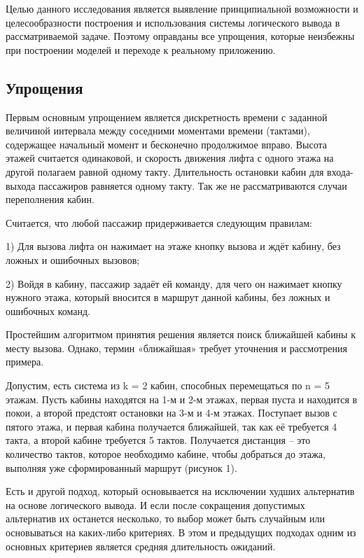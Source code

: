 
	Целью данного исследования является выявление принципиальной возможности и целесообразности построения
		и использования системы логического вывода в рассматриваемой задаче.
		Поэтому оправданы все упрощения, которые неизбежны при построении моделей и переходе к реальному приложению.

\subsection{Упрощения}
	Первым основным упрощением является дискретность времени с заданной величиной интервала между
		соседними моментами времени (тактами), содержащее начальный момент и бесконечно продолжимое вправо.
		Высота этажей считается одинаковой, и скорость движения лифта с одного этажа на другой полагаем
		равной одному такту. Длительность остановки кабин для входа-выхода пассажиров равняется одному такту.
		Так же не рассматриваются случаи переполнения кабин.

	Считается, что любой пассажир придерживается следующим правилам:

	1) Для вызова лифта он нажимает на этаже кнопку вызова и ждёт кабину, без ложных и ошибочных вызовов;

	2) Войдя в кабину, пассажир задаёт ей команду, для чего он нажимает кнопку нужного этажа,
		который вносится в маршрут данной кабины, без ложных и ошибочных команд.

	Простейшим алгоритмом принятия решения является поиск ближайшей кабины к месту вызова.
		Однако, термин «ближайшая» требует уточнения и рассмотрения примера. 

	Допустим, есть система из k = 2 кабин, способных перемещаться по n = 5 этажам.
		Пусть кабины находятся на 1-м и 2-м этажах, первая пуста и находится в покои,
		а второй предстоят остановки на 3-м и 4-м этажах. Поступает вызов с пятого этажа,
		и первая кабина получается ближайшей, так как её требуется 4 такта,
		а второй кабине требуется 5 тактов. Получается дистанция – это количество тактов,
		которое необходимо кабине, чтобы добраться до этажа, выполняя уже сформированный маршрут (рисунок 1).

	Есть и другой подход, который основывается на исключении худших альтернатив на основе логического вывода.
		И если после сокращения допустимых альтернатив их останется несколько,
		то выбор может быть случайным или основываться на каких-либо критериях.
		В этом и предыдущих подходах одним из основных критериев является средняя длительность ожиданий.

